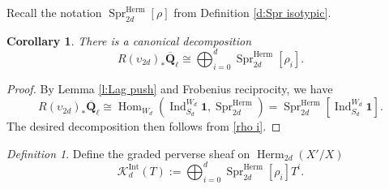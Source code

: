 \documentclass[reqno]{amsart}
\numberwithin{equation}{section}
\newcommand{\tony}[1]{{\color{blue} \sf
    $\spadesuit\spadesuit\spadesuit$ TONY: [#1]}}
\newcommand{\wt}[1]{\widetilde{#1}}
\newcommand{\Q}{\mathbf{Q}}
\newcommand{\mrm}[1]{\mathrm{#1}}
\DeclareMathOperator{\Hom}{Hom}
\DeclareMathOperator{\Ind}{Ind}
\DeclareMathOperator{\Herm}{Herm}
\DeclareMathOperator{\Lagr}{Lagr}
\DeclareMathOperator{\supp}{supp}
\DeclareMathOperator{\Spr}{Spr}
\newcommand{\Qlbar}{\overline{\Q}_\ell}
\newcommand\xr{\xrightarrow}
\newcommand\one{\mathbf{1}}
\newcommand\so{\mathfrak{so}}
\newcommand\Og{\mathrm{O}}
\renewcommand{\l}{\lambda}
\renewcommand{\r}{\rho}
\newcommand\cK{\mathcal{K}}
\newtheorem{cor}[thm]{Corollary}
\theoremstyle{remark}
\newtheorem{defn}[thm]{Definition}
\numberwithin{equation}{section}
\begin{document}
Recall the notation $\Spr^{\Herm}_{2d}[\r]$ from Definition \ref{d:Spr isotypic}.
\begin{cor}\label{c:Lag decomp} There is a canonical decomposition 
\begin{equation}\label{decomp ph}
R(\upsilon_{2d})_{*}\Qlbar\cong\bigoplus_{i=0}^{d}\Spr^{\Herm}_{2d}[\r_{i}].
\end{equation}
\end{cor}
\begin{proof}
By Lemma \ref{l:Lag push} and Frobenius reciprocity,  we have
\begin{equation}
R(\upsilon_{2d})_{*}\Qlbar\cong \Hom_{W_{d}}(\Ind_{S_{d}}^{W_{d}}\one, \Spr^{\Herm}_{2d})=\Spr^{\Herm}_{2d}[\Ind_{S_{d}}^{W_{d}}\one].
\end{equation}
The desired decomposition then follows from \eqref{rho i}.
\end{proof}


\begin{defn}\label{def:Kd}
Define the graded perverse sheaf on $\Herm_{2d}(X'/X)$ 
\begin{equation}
\cK_{d}^{\mrm{Int}}(T) := \bigoplus_{i=0}^d \Spr^{\Herm}_{2d}[\r_{i}] T^{i}.
\end{equation}
\end{defn}



\end{document}
